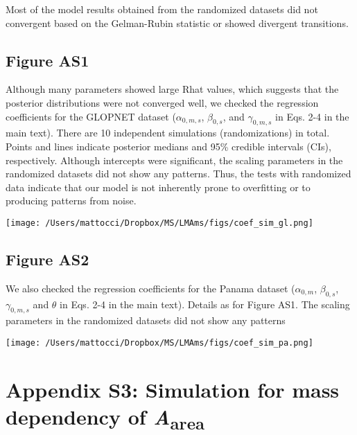 \documentclass[
  12pt,
  letterpaper,
  DIV=11,
  numbers=noendperiod]{scrartcl}
\begin{document}
Most of the model results obtained from the randomized datasets did not
convergent based on the Gelman-Rubin statistic or showed divergent
transitions.

\newpage

\hypertarget{figure-as1}{%
\subsection{Figure AS1}\label{figure-as1}}

Although many parameters showed large Rhat values, which suggests that
the posterior distributions were not converged well, we checked the
regression coefficients for the GLOPNET dataset (\(\alpha_{0, m, s}\),
\(\beta_{0, s}\), and \(\gamma_{0, m, s}\) in Eqs. 2-4 in the main
text). There are 10 independent simulations (randomizations) in total.
Points and lines indicate posterior medians and 95\% credible intervals
(CIs), respectively. Although intercepts were significant, the scaling
parameters in the randomized datasets did not show any patterns. Thus,
the tests with randomized data indicate that our model is not inherently
prone to overfitting or to producing patterns from noise.

\texttt{[image: /Users/mattocci/Dropbox/MS/LMAms/figs/coef\_sim\_gl.png]}

\newpage

\hypertarget{figure-as2}{%
\subsection{Figure AS2}\label{figure-as2}}

We also checked the regression coefficients for the Panama dataset
(\(\alpha_{0, m}\), \(\beta_{0, s}\), \(\gamma_{0, m, s}\) and
\(\theta\) in Eqs. 2-4 in the main text). Details as for Figure AS1. The
scaling parameters in the randomized datasets did not show any patterns

\texttt{[image: /Users/mattocci/Dropbox/MS/LMAms/figs/coef\_sim\_pa.png]}

\newpage

\hypertarget{appendix-s3-simulation-for-mass-dependency-of-aarea}{%
\section{\texorpdfstring{Appendix S3: Simulation for mass dependency of
\emph{A}\textsubscript{area}}{Appendix S3: Simulation for mass dependency of Aarea}}\label{appendix-s3-simulation-for-mass-dependency-of-aarea}}
\end{document}
